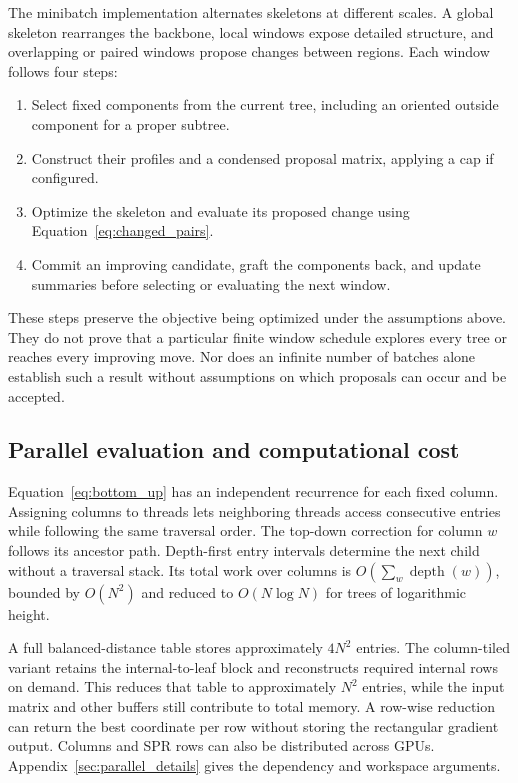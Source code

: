 \documentclass[11pt,a4paper]{article}
\makeatletter
\DeclareRobustCommand{\_}{\ifmmode\nfss@text{\textunderscore}\else\textunderscore\allowbreak\fi}
\theoremstyle{definition}
\makeatother
\begin{document}
The minibatch implementation alternates skeletons at different scales.
A global skeleton rearranges the backbone, local windows expose detailed structure, and overlapping or paired windows propose changes between regions.
Each window follows four steps:
\begin{enumerate}
 \item Select fixed components from the current tree, including an oriented outside component for a proper subtree.
 \item Construct their profiles and a condensed proposal matrix, applying a cap if configured.
 \item Optimize the skeleton and evaluate its proposed change using Equation~\eqref{eq:changed_pairs}.
 \item Commit an improving candidate, graft the components back, and update summaries before selecting or evaluating the next window.
\end{enumerate}
These steps preserve the objective being optimized under the assumptions above.
They do not prove that a particular finite window schedule explores every tree or reaches every improving move.
Nor does an infinite number of batches alone establish such a result without assumptions on which proposals can occur and be accepted.

\subsection{Parallel evaluation and computational cost}
\label{sec:parallel}

Equation~\eqref{eq:bottom_up} has an independent recurrence for each fixed column.
Assigning columns to threads lets neighboring threads access consecutive entries while following the same traversal order.
The top-down correction for column $w$ follows its ancestor path.
Depth-first entry intervals determine the next child without a traversal stack.
Its total work over columns is $O(\sum_w\operatorname{depth}(w))$, bounded by $O(N^2)$ and reduced to $O(N\log N)$ for trees of logarithmic height.

A full balanced-distance table stores approximately $4N^2$ entries.
The column-tiled variant retains the internal-to-leaf block and reconstructs required internal rows on demand.
This reduces that table to approximately $N^2$ entries, while the input matrix and other buffers still contribute to total memory.
A row-wise reduction can return the best coordinate per row without storing the rectangular gradient output.
Columns and SPR rows can also be distributed across GPUs.
Appendix~\ref{sec:parallel_details} gives the dependency and workspace arguments.
\end{document}

